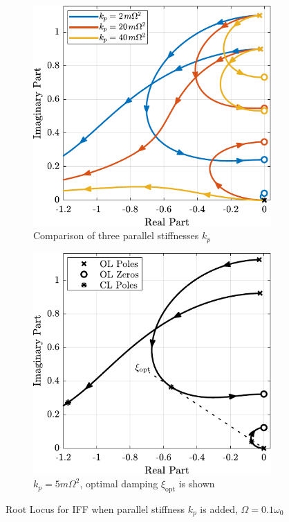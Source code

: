 \documentclass{ISMA_USD2020}
\begin{document}
\begin{figure}[htbp]
\begin{subfigure}[c]{0.49\linewidth}
\includegraphics[width=\linewidth]{figs/root_locus_iff_kps.pdf}
\caption{\label{fig:root_locus_iff_kps} Comparison of three parallel stiffnesses \(k_p\)}
\end{subfigure}
\begin{subfigure}[c]{0.49\linewidth}
\includegraphics[width=\linewidth]{figs/root_locus_opt_gain_iff_kp.pdf}
\caption{\label{fig:root_locus_opt_gain_iff_kp} \(k_p = 5 m \Omega^2\), optimal damping \(\xi_\text{opt}\) is shown}
\end{subfigure}
\caption{\label{fig:root_locus_iff_kps_opt}Root Locus for IFF when parallel stiffness \(k_p\) is added, \(\Omega = 0.1 \omega_0\)}
\centering
\end{figure}
\end{document}
